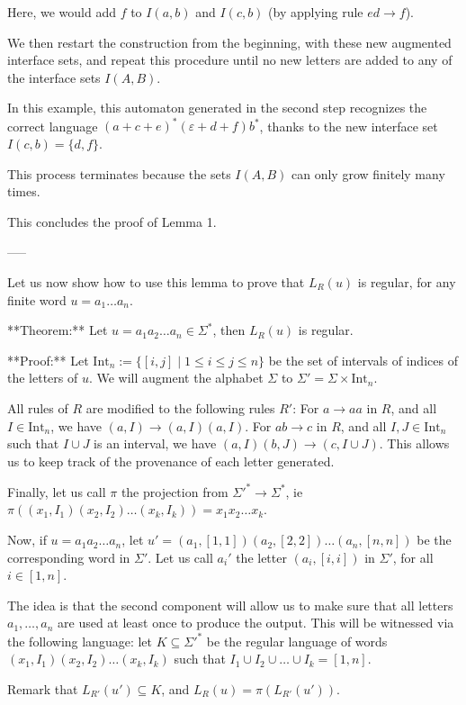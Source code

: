 \documentclass[12pt]{article}
\begin{document}
Here, we would add $f$ to $I(a,b)$ and $I(c,b)$ (by applying rule $ed\to f$).

We then restart the construction from the beginning, with these new augmented interface sets, and repeat this procedure until no new letters are added to any of the interface sets $I(A,B)$.

In this example, this automaton generated in the second step recognizes the correct language $(a+c+e)^*(\varepsilon+d+f)b^*$, thanks to the new interface set $I(c,b)=\{d,f\}$.

This process terminates because the sets $I(A,B)$ can only grow finitely many times.

This concludes the proof of Lemma 1.

-----

Let us now show how to use this lemma to prove that $L_R(u)$ is regular, for any finite word $u=a_1\dots a_n$.

**Theorem:** Let $u=a_1a_2\dots a_n\in\Sigma^*$, then $L_R(u)$ is regular.

**Proof:**
Let $\mathrm{Int}_n:=\{[i,j]\mid 1\leq i\leq j\leq n\}$ be the set of intervals of indices of the letters of $u$.
We will augment the alphabet $\Sigma$ to $\Sigma'=\Sigma\times\mathrm{Int}_n$. 

All rules of $R$ are modified to the following rules $R'$:
For $a\to aa$ in $R$, and all $I\in\mathrm{Int}_n$, we have $(a,I)\to (a,I)(a,I)$.
For $ab\to c$ in $R$, and all $I,J\in\mathrm{Int}_n$ such that $I\cup J$ is an interval, we have $(a,I)(b,J)\to (c,I\cup J)$.
This allows us to keep track of the provenance of each letter generated.

Finally, let us call $\pi$ the projection from $\Sigma'^*\to\Sigma^*$, ie $\pi((x_1,I_1)(x_2,I_2)\dots(x_k,I_k))=x_1x_2\dots x_k$.

Now, if $u=a_1a_2\dots a_n$, let $u'=(a_1,[1,1])(a_2,[2,2])\dots(a_n,[n,n])$ be the corresponding word in $\Sigma'$. Let us call $a_i'$ the letter $(a_i,[i,i])$ in $\Sigma'$, for all $i\in[1,n]$.

The idea is that the second component will allow us to make sure that all letters $a_1,\dots,a_n$ are used at least once to produce the output. 
This will be witnessed via the following language: let $K\subseteq\Sigma'^*$ be the regular language of words $(x_1,I_1)(x_2,I_2)\dots(x_k,I_k)$ such that $I_1\cup I_2\cup\dots\cup I_k=[1,n]$.

Remark that $L_{R'}(u')\subseteq K$, and $L_R(u)=\pi(L_{R'}(u'))$.
\end{document}
